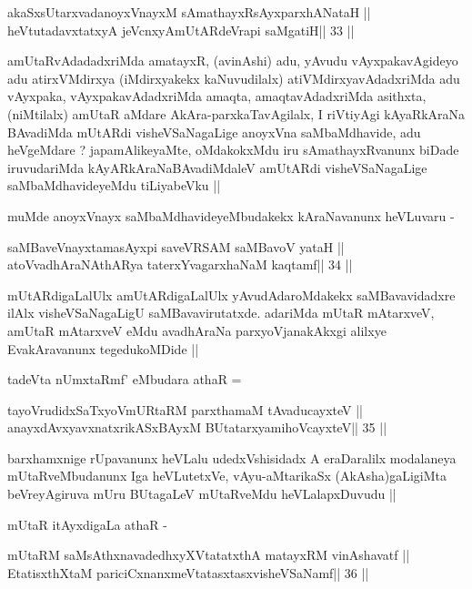 \begin{shl}
akaSxsUtarxvadanoyxVnayxM sAmathayxRsAyxparxhANataH ||
heVtutadavxtatxyA jeVcnxyA\s mUtARdeVrapi saMgatiH\hfill || 33 ||
\end{shl}

\begin{artha}
amUtaRvAdadadxriMda amatayxR, (avinAshi) adu, yAvudu vAyxpakavAgideyo
adu atirxVMdirxya (iMdirxyakekx kaNuvudilalx) atiVMdirxyavAdadxriMda
adu vAyxpaka, vAyxpakavAdadxriMda amaqta, amaqtavAdadxriMda asithxta,
(niMtilalx) amUtaR aMdare AkAra-parxkaTavAgilalx, I riVtiyAgi
kAyaRkAraNa BAvadiMda mUtARdi visheVSaNagaLige anoyxVna saMbaMdhavide,
adu heVgeMdare ? japamAlikeyaMte, oMdakokxMdu iru sAmathayxRvanunx
biDade iruvudariMda kAyARkAraNaBAvadiMdaleV amUtARdi visheVSaNagaLige
saMbaMdhavideyeMdu tiLiyabeVku ||

muMde anoyxVnayx saMbaMdhavideyeMbudakekx kAraNavanunx heVLuvaru -
\end{artha}

\begin{shl}
saMBaveV\s nayxtamasAyxpi saveVRSAM saMBavoV yataH ||
atoV\s vadhAraNAthARya taterxYvagarxhaNaM kaqtamf\hfill || 34 ||
\end{shl}

\begin{artha}
mUtARdigaLalUlx amUtARdigaLalUlx yAvudAdaroMdakekx saMBavavidadxre
ilAlx visheVSaNagaLigU saMBavavirutatxde. adariMda mUtaR mAtarxveV,
amUtaR mAtarxveV eMdu avadhAraNa parxyoVjanakAkxgi alilxye
EvakAravanunx tegedukoMDide ||

tadeVta nUmxtaRmf' eMbudara athaR =
\end{artha}

\begin{shl}
tayoVrudidxSaTxyoVmURtaRM parxthamaM tAvaducayxteV ||
anayxdAvxyavxnatxrikASxBAyxM BUtatarxyamihoVcayxteV\hfill || 35 ||
\end{shl}

\begin{artha}
barxhamxnige rUpavanunx heVLalu udedxVshisidadx A eraDaralilx
modalaneya mUtaRveMbudanunx Iga heVLutetxVe, vAyu-aMtarikaSx
(AkAsha)gaLigiMta beVreyAgiruva mUru BUtagaLeV mUtaRveMdu
heVLalapxDuvudu ||

mUtaR itAyxdigaLa athaR -
\end{artha}

\begin{shl}
mUtaRM saMsAthxnavadedhxyXVtatatxthA matayxRM vinAshavatf ||
EtatisxthXtaM pariciCxnanxmeVtatasxtasxvisheVSaNamf\hfill || 36 ||
\end{shl}

